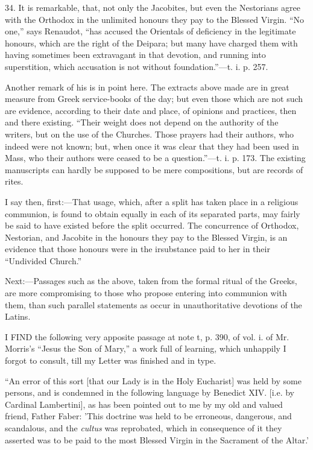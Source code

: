 34. It is remarkable, that, not only the Jacobites, but even the
Nestorians agree with the Orthodox in the unlimited honours they pay to
the Blessed Virgin. ``No one,'' says Renaudot, ``has accused
the Orientals of deficiency in the legitimate honours, which are the
right of the Deipara; but many have charged them with having sometimes
been extravagant in that devotion, and running into superstition, which
accusation is not without foundation.''—t. i. p. 257.


Another remark of his is in point here. The extracts above made are
in great measure from Greek service-books of the day; but even those
which are not such are evidence, according to their date and place, of
opinions and practices, then and there existing. ``Their weight does
not depend on the authority of the writers, but on the use of the
Churches. Those prayers had their authors, who indeed were not
known; but, when once it was clear that they had been used in Mass, who
their authors were ceased to be a question.''—t. i. p. 173. The
existing manuscripts can hardly be supposed to be mere compositions, but
are records of rites.


I say then, first:—That usage, which, after a split has taken place
in a religious communion, is found to obtain equally in each of its
separated parts, may fairly be said to have existed before the split
occurred. The concurrence of Orthodox, Nestorian, and Jacobite in the
honours they pay to the Blessed Virgin, is an evidence that those
honours were in the irsubstance paid to her in their ``Undivided
Church.''


Next:—Passages such as the above, taken from the formal ritual of
the Greeks, are more compromising to those who propose entering into
communion with them, than such parallel statements as occur in
unauthoritative devotions of the Latins.









I FIND the following very apposite passage at
note t, p. 390, of vol. i. of Mr. Morris's ``Jesus the Son of
Mary,'' a work full of learning, which unhappily I forgot to
consult, till my Letter was finished and in type.


``An error of this sort [that our Lady is in the Holy Eucharist]
was held by some persons, and is condemned in the following language by
Benedict XIV. [i.e. by Cardinal Lambertini], as has been pointed out to
me by my old and valued friend, Father Faber: 'This doctrine was held to
be erroneous, dangerous, and scandalous, and the \emph{cultus} was
reprobated, which in consequence of it they asserted was to be paid to
the most Blessed Virgin in the Sacrament of the Altar.'


